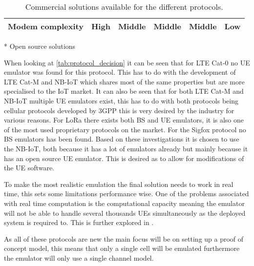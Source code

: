 \begin{table}[H]
{\begin{tabular}{|c|c|c|c|c|c|}
Modem complexity	& High 				& Middle 				& Middle 			& Middle 		& Low				\\ \hline
\end{tabular}}
\raggedright \scriptsize{ * Open source solutions} 
\caption{Commercial solutions available for the different protocols. \citep{UE_list, Amarisoft_solutions, SRS_solutions, LORA_solutions, Things_solutions, Mira_solutions, Telit_solutions, telefonicaid_solutions, murata_solutions}}%
\label{tab:protocol_decision}
\end{table}


When looking at \autoref{tab:protocol_decision} it can be seen that for \gls{LTE} Cat-0 no \gls{UE} emulator was found for this protocol. This has to do with the development of \gls{LTE} Cat-M and \gls{NB-IoT} which shares most of the same properties but are more specialised to the \gls{IoT} market. It can also be seen that for both \gls{LTE} Cat-M and \gls{NB-IoT} multiple \gls{UE} emulators exist, this has to do with both protocols being cellular protocols developed by \gls{3GPP} this is very desired by the industry for various reasons. For \gls{LoRa} there exists both  \gls{BS} and \gls{UE} emulators, it is also one of the most used proprietary protocols on the market. For the Sigfox protocol no \gls{BS} emulators has been found. Based on these investigations it is chosen to use the \gls{NB-IoT}, both because it has a lot of emulators already but mainly because it has an open source \gls{UE} emulator. This is desired as to allow for modifications of the \gls{UE} software.  


To make the most realistic emulation the final solution needs to work in real time, this sets some limitations performance wise. One of the problems associated with real time computation is the computational capacity meaning the emulator will not be able to handle several thousands \gls{UE}s simultaneously as the deployed system is required to. This is further explored in .

As all of these protocols are new the main focus will be on setting up a proof of concept model, this means that only a single cell will be emulated furthermore the emulator will only use a single channel model. 





